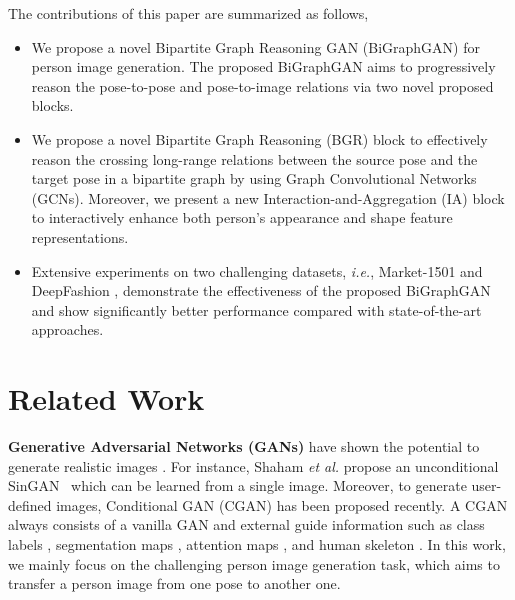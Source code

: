 \documentclass{bmvc2k}
\begin{document}
The contributions of this paper are summarized as follows,
\begin{itemize}[leftmargin=*]
	\item We propose a novel Bipartite Graph Reasoning GAN (BiGraphGAN) for person image generation. The proposed BiGraphGAN aims to progressively reason the pose-to-pose and pose-to-image relations via two novel proposed blocks.
	\item We propose a novel Bipartite Graph Reasoning (BGR) block to effectively reason the crossing long-range relations between the source pose and the target pose in a bipartite graph by using Graph Convolutional Networks (GCNs).
	Moreover, we present a new Interaction-and-Aggregation (IA) block to interactively enhance both person's appearance and shape feature representations.
	\item Extensive experiments on two challenging datasets, \emph{i.e.}, Market-1501 \cite{zheng2015scalable} and DeepFashion \cite{liu2016deepfashion}, demonstrate the effectiveness of the proposed BiGraphGAN and show significantly better performance compared with state-of-the-art approaches.
\end{itemize} \section{Related Work}
\noindent \textbf{Generative Adversarial Networks (GANs)} \cite{goodfellow2014generative} have shown the potential to generate realistic images \cite{shaham2019singan,karras2019style,brock2019large}.
For instance, Shaham \emph{et al.} propose an unconditional SinGAN~\cite{shaham2019singan} which can be learned from a single image.
Moreover, to generate user-defined images, Conditional GAN (CGAN) \cite{mirza2014conditional} has been proposed recently.
A CGAN always consists of a vanilla GAN and external guide information such as class labels \cite{wu2019relgan,choi2018stargan,zhang2018sparsely}, segmentation maps \cite{tang2019multi,park2019semantic,tang2020local,liu2020exocentric}, attention maps \cite{kim2019u,tang2019attention,mejjati2018unsupervised}, and human skeleton \cite{albahar2019guided,balakrishnan2018synthesizing,zhu2019progressive,tang2018gesturegan,tang2020xinggan}.
In this work, we mainly focus on the challenging person image generation task, which aims to transfer a person image from one pose to another one. 
\end{document}

